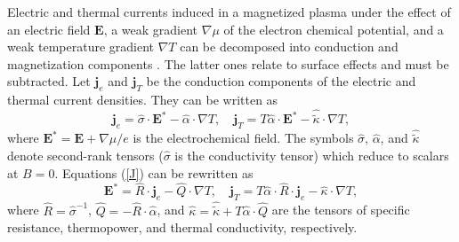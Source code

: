 \documentclass[smallextended]{svjour3}       %
\begin{document}
Electric and thermal currents
induced in a magnetized plasma
under the effect of an electric field $\bm{E}$, a
weak gradient $\nabla\mu$ of the electron 
chemical potential, and a weak temperature gradient $\nabla T$
 can be decomposed into conduction
and magnetization
 components \citep[e.g.,][]{Hernquist84}.
The latter ones relate to surface effects and
must be subtracted.
Let $\bm{j}_e$ and $\bm{j}_T$ be the conduction components of
the electric and thermal current densities. They can be written as
\begin{equation}
   \bm{j}_e = \hat{\sigma}\cdot\bm{E}^\ast - \hat{\alpha}\cdot\nabla T,
\quad
\bm{j}_T = T\hat{\alpha}\cdot\bm{E}^\ast-\hat{\tilde\kappa}\cdot\nabla T,
\label{J}
\end{equation}
where $\bm{E}^\ast = \bm{E}+\nabla\mu/e$
is the electrochemical field.
The symbols $\hat{\sigma}$, $\hat{\alpha}$, 
and $\hat{\tilde\kappa}$ denote second-rank tensors
($\hat{\sigma}$ is the conductivity tensor)
which reduce to scalars at $B=0$.
Equations (\ref{J}) can be rewritten as
\begin{equation}
   \bm{E}^\ast = \hat{R}\cdot\bm{j}_e - \hat{Q}\cdot\nabla T,
\quad
   \bm{j}_T = T \hat{\alpha}\cdot\hat{R}\cdot\bm{j}_e - \hat{\kappa}\cdot\nabla T,
\label{J1}
\end{equation}
where 
$\hat{R}=\hat{\sigma}^{-1}$,
$\hat{Q}=-\hat{R}\cdot\hat{\alpha}$, and
$\hat{\kappa} = \hat{\tilde\kappa} + T\hat{\alpha}\cdot \hat{Q}$
are the tensors of 
specific resistance, thermopower, and thermal conductivity,
 respectively.
\end{document}

